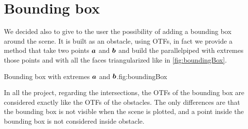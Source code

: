 \documentclass[dissertation.tex]{subfiles}
\begin{document}
\section{Bounding box}
We decided also to give to the user the possibility of adding a
bounding box around the scene. It is built as an obstacle, using
\acp{OTF}, in fact we provide a method that take two points $\boldsymbol{a}$
and $\boldsymbol{b}$ and build the parallelpiped with extremes those points and with
all the faces triangularized like in \cref{fig:boundingBox}.
\begin{myfig}{Bounding box with extremes $\boldsymbol{a}$ and $\boldsymbol{b}$.}{fig:boundingBox}
\end{myfig}

In all the project, regarding the intersections, the \acp{OTF} of the
bounding box are considered
exactly like the \acp{OTF} of the obstacles. The only differences are
that the bounding box is not visible when the scene is plotted, and a
point inside the bounding box is not considered inside obstacle.
\end{document}
